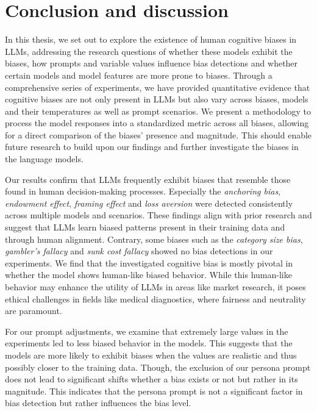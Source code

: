 \section{Conclusion and discussion}
\label{chapter:discussionoutlook}

\par In this thesis, we set out to explore the existence of human cognitive biases in LLMs, addressing the research questions of whether these models exhibit the biases, how prompts and variable values influence bias detections and whether certain models and model features are more prone to biases. Through a comprehensive series of experiments, we have provided quantitative evidence that cognitive biases are not only present in LLMs but also vary across biases, models and their temperatures as well as prompt scenarios. We present a methodology to process the model responses into a standardized metric across all biases, allowing for a direct comparison of the biases' presence and magnitude. This should enable future research to build upon our findings and further investigate the biases in the language models.

\par Our results confirm that LLMs frequently exhibit biases that resemble those found in human decision-making processes. Especially the \textit{anchoring bias}, \textit{endowment effect}, \textit{framing effect} and \textit{loss aversion} were detected consistently across multiple models and scenarios. These findings align with prior research and suggest that LLMs learn biased patterns present in their training data and through human alignment. Contrary, some biases such as the \textit{category size bias}, \textit{gambler's fallacy} and \textit{sunk cost fallacy} showed no bias detections in our experiments. We find that the investigated cognitive bias is mostly pivotal in whether the model shows human-like biased behavior. While this human-like behavior may enhance the utility of LLMs in areas like market research, it poses ethical challenges in fields like medical diagnostics, where fairness and neutrality are paramount.

\par For our prompt adjustments, we examine that extremely large values in the experiments led to less biased behavior in the models. This suggests that the models are more likely to exhibit biases when the values are realistic and thus possibly closer to the training data. Though, the exclusion of our persona prompt does not lead to significant shifts whether a bias exists or not but rather in its magnitude. This indicates that the persona prompt is not a significant factor in bias detection but rather influences the bias level. 


